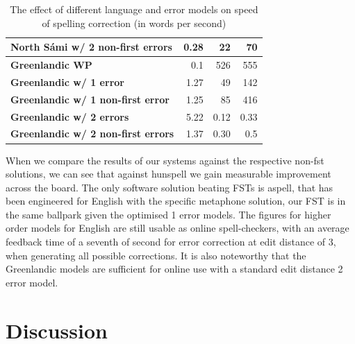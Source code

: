 \documentclass[a4paper,12pt]{article}
\begin{document}
\begin{table}
\begin{tabular}{|l|r|r|r|}
\bf North Sámi w/ 2 non-first errors & 0.28 & 22    & 70    \\
        \hline
        \bf Greenlandic WP    & 0.1  & 526 & 555\\
        \hline
        \bf Greenlandic w/ 1 error    & 1.27 & 49 & 142 \\
\bf Greenlandic w/ 1 non-first error  & 1.25 & 85 & 416 \\
       \bf Greenlandic w/ 2 errors    & 5.22 & 0.12 & 0.33 \\
\bf Greenlandic w/ 2 non-first errors & 1.37 & 0.30 & 0.5 \\
        \hline
    \end{tabular}
    \caption{The effect of different language and error models on speed of
        spelling correction (in words per second) \label{table:speed}}
\end{table}

When we compare the results of our systems against the respective non-fst
solutions, we can see that against hunspell we gain measurable improvement
across the board. The only software solution beating FSTs is aspell, that has
been engineered for English with the specific metaphone solution, our FST is in
the same ballpark given the optimised 1 error models. The figures for higher
order models for English are still usable as online spell-checkers, with an
average feedback time of a seventh of second for error correction at edit
distance of 3, when generating all possible corrections. It is also noteworthy
that the Greenlandic models are sufficient for online use with a standard edit
distance 2 error model.

%

\section{Discussion}
\label{sec:discussion}
\end{document}
